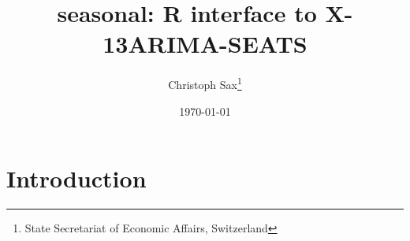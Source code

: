 \documentclass[a4paper, 10pt]{article}
\begin{document}
\title{\textbf{seasonal}: R interface to X-13ARIMA-SEATS}

\author{Christoph Sax\footnote{State Secretariat of Economic Affairs, Switzerland}
}

\date{\today}
\maketitle

\section{Introduction}


\end{document}
